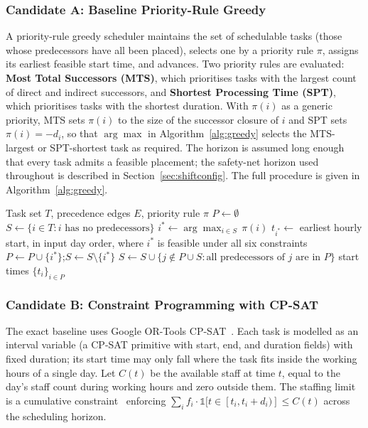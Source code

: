 \documentclass[conference]{IEEEtran}
\begin{document}
\subsubsection{Candidate A: Baseline Priority-Rule Greedy}

A priority-rule greedy scheduler maintains the set of schedulable
tasks (those whose predecessors have all been placed), selects one
by a priority rule $\pi$, assigns its earliest feasible start time,
and advances. Two priority rules are evaluated: \textbf{Most Total Successors
(MTS)}, which prioritises tasks with the largest count of direct
and indirect successors, and \textbf{Shortest Processing Time
(SPT)}, which prioritises tasks with the shortest duration. With
$\pi(i)$ as a generic priority, MTS sets $\pi(i)$ to the size of
the successor closure of $i$ and SPT sets $\pi(i) = -d_i$, so that
$\arg\max$ in Algorithm~\ref{alg:greedy} selects the MTS-largest or
SPT-shortest task as required. The
horizon is assumed long enough that every task admits a feasible
placement; the safety-net horizon used throughout is described in
Section~\ref{sec:shiftconfig}. The full procedure is given in
Algorithm~\ref{alg:greedy}.

\begin{algorithm}[t]
\caption{Priority-rule greedy scheduler (Candidate A).}
\label{alg:greedy}
\begin{algorithmic}[1]
\REQUIRE Task set $T$, precedence edges $E$, priority rule $\pi$
\STATE $P \gets \emptyset$ 
\STATE $S \gets \{i \in T : i \text{ has no predecessors}\}$
  \STATE $i^{*} \gets \arg\max_{i \in S}\, \pi(i)$
  \STATE $t_{i^{*}} \gets$ earliest hourly start, in input day order, where $i^{*}$ is feasible under all six constraints
  \STATE $P \gets P \cup \{i^{*}\}$;\quad $S \gets S \setminus \{i^{*}\}$
  \STATE $S \gets S \cup \{j \notin P \cup S : \text{all predecessors of } j \text{ are in } P\}$
\ENDWHILE
\RETURN start times $\{t_i\}_{i \in P}$
\end{algorithmic}
\end{algorithm}

\subsubsection{Candidate B: Constraint Programming with CP-SAT}

The exact baseline uses Google OR-Tools CP-SAT~\cite{ortools}. Each
task is modelled as an interval variable (a CP-SAT primitive with
start, end, and duration fields) with fixed duration; its start time
may only fall where the task fits inside the working hours of a single
day. Let $C(t)$ be the available staff at time $t$, equal to the day's
staff count during working hours and zero outside them. The staffing
limit is a cumulative constraint~\cite{vilim2011fastcumulative}
enforcing $\sum_i f_i \cdot \mathbb{1}[t \in [t_i, t_i + d_i)] \leq
C(t)$ across the scheduling horizon.
\end{document}
